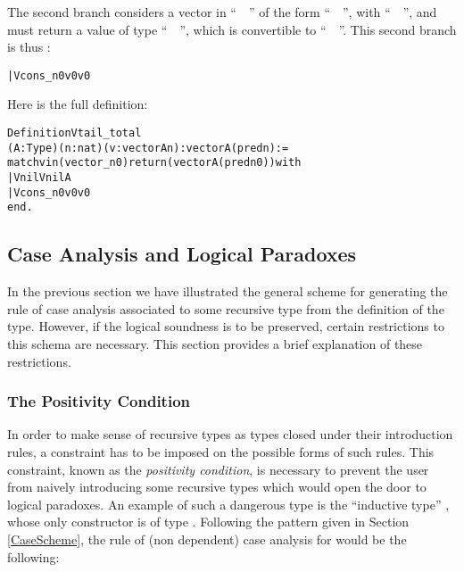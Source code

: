 \documentclass[11pt]{article}
\begin{document}
The second branch considers a vector in ``~~''
of the form
``~~'', with ``~~'',
and must return a value of type ``~~'',
which is convertible to ``~~''.
This second branch is thus :
\begin{alltt}
| Vcons _ n0 v0 {\funarrow} v0
\end{alltt}

Here is the full definition:

\begin{alltt}
Definition Vtail_total 
   (A : Type) (n : nat) (v : vector A n) : vector A (pred n):=
match v in (vector _ n0) return (vector A (pred n0)) with
| Vnil {\funarrow} Vnil A
| Vcons _ n0 v0 {\funarrow} v0
end.
\end{alltt}


\subsection{Case Analysis and Logical Paradoxes}

In the previous section we have illustrated the general scheme for
generating the rule of case analysis associated to some recursive type
from the definition of the type. However, if the logical soundness is
to be preserved, certain restrictions to this schema are
necessary. This section provides a brief explanation of these
restrictions.


\subsubsection{The Positivity Condition}
\label{postypes}

In order to make sense of recursive types as types closed under their
introduction rules, a constraint has to be imposed on the possible
forms of such rules. This constraint, known as the
\textsl{positivity condition}, is necessary to prevent the user from
naively introducing some recursive types which would open the door to
logical paradoxes.  An example of such a dangerous type is the
``inductive type'' , whose only constructor is 
 of type .
 Following the pattern
given in Section \ref{CaseScheme}, the rule of (non dependent) case
analysis for  would be the following:

\begin{center}
         {}
\end{center}
\end{document}
